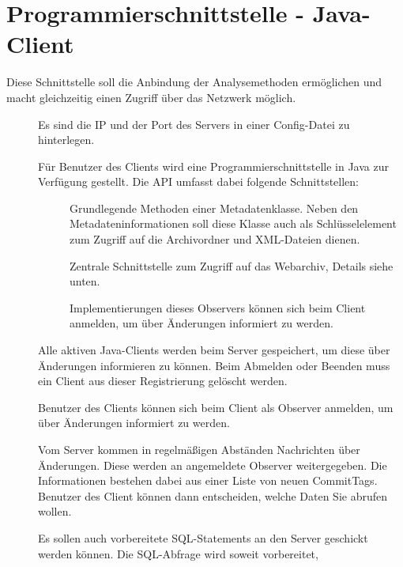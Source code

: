 \section{Programmierschnittstelle - Java-Client}\label{spec:client}
	Diese Schnittstelle soll die Anbindung der Analysemethoden ermöglichen und 
	macht gleichzeitig einen Zugriff über das Netzwerk möglich.
\begin{description}
	\item []
		Es sind die IP und der Port des Servers in einer Config-Datei zu hinterlegen.
	\item []
		Für Benutzer des Clients wird eine Programmierschnittstelle in Java zur Verfügung gestellt.
		Die API umfasst dabei folgende Schnittstellen:
		\begin{description}
			\item []
				Grundlegende Methoden einer Metadatenklasse.
				Neben den Metadateninformationen soll diese Klasse auch als
				Schlüsselelement zum Zugriff auf die Archivordner und XML-Dateien dienen.
			\item []
				Zentrale Schnittstelle zum Zugriff auf das Webarchiv, Details siehe unten.
			\item []
				Implementierungen dieses Observers können sich beim Client anmelden, 
				um über Änderungen informiert zu werden.
		\end{description}
	\item []
		Alle aktiven Java-Clients werden beim Server gespeichert, 
		um diese über Änderungen informieren zu können.
		Beim Abmelden oder Beenden muss ein Client aus dieser Registrierung gelöscht werden.
	\item []
		Benutzer des Clients können sich beim Client als Observer anmelden, 
		um über Änderungen informiert zu werden.
	\item []
		Vom Server kommen in regelmäßigen Abständen Nachrichten über Änderungen.
		Diese werden an angemeldete Observer weitergegeben.
		Die Informationen bestehen dabei aus einer Liste von neuen CommitTags.
		Benutzer des Client können dann entscheiden, welche Daten Sie abrufen wollen.
	\item []
		Es sollen auch vorbereitete SQL-Statements an den Server geschickt werden können. 
		Die SQL-Abfrage wird soweit vorbereitet, 

\end{description}
